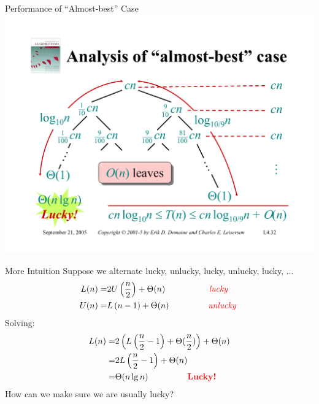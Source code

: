 \documentclass{beamer}
\begin{document}
\begin{frame}{Performance of ``Almost-best'' Case}
    \centering
    \includegraphics[width=\textwidth, trim={1.00cm 1.50cm 1.00cm 4.25cm}, clip]{pages/lec4_32}
\end{frame}

\begin{frame}{More Intuition}
    Suppose we alternate lucky, unlucky, lucky, unlucky, lucky, ...
    \begin{equation*}
        \begin{split}
            L(n) =& 2U\left(\frac{n}{2}\right) + \Theta(n) \text{\hspace{17mm} \textcolor{red}{\textit{lucky}} } \\
            U(n) =& L\left(n - 1\right) + \Theta(n) \text{\hspace{15mm} \textcolor{red}{\textit{unlucky}} } \\
        \end{split}
    \end{equation*}
    Solving:
    \begin{equation*}
        \begin{split}
            L(n) =& 2\left(L\left(\frac{n}{2} - 1 \right) + \Theta(\frac{n}{2})\right) + \Theta(n) \\
                 =& 2L\left(\frac{n}{2} - 1 \right) + \Theta(n) \\
                 =& \Theta(n \lg n) \text{\hspace{15mm} \textbf{\textcolor{red}{Lucky!}}}
        \end{split}
    \end{equation*}
    How can we make sure we are usually lucky?
\end{frame}
\end{document}

